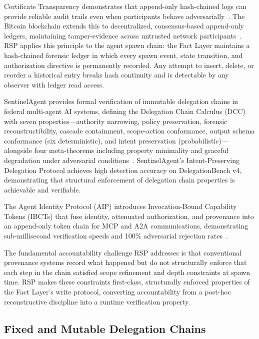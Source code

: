 Certificate Transparency demonstrates that append-only hash-chained logs can provide reliable audit trails even when participants behave adversarially~\cite{laurie2013certificate}. The Bitcoin blockchain extends this to decentralized, consensus-based append-only ledgers, maintaining tamper-evidence across untrusted network participants~\cite{nakamoto2008bitcoin}. RSP applies this principle to the agent spawn chain: the Fact Layer maintains a hash-chained forensic ledger in which every spawn event, state transition, and authorization directive is permanently recorded. Any attempt to insert, delete, or reorder a historical entry breaks hash continuity and is detectable by any observer with ledger read access.

SentinelAgent provides formal verification of immutable delegation chains in federal multi-agent AI systems, defining the Delegation Chain Calculus (DCC) with seven properties---authority narrowing, policy preservation, forensic reconstructibility, cascade containment, scope-action conformance, output schema conformance (six deterministic), and intent preservation (probabilistic)---alongside four meta-theorems including property minimality and graceful degradation under adversarial conditions~\cite{sentinelagent2026}. SentinelAgent's Intent-Preserving Delegation Protocol achieves high detection accuracy on DelegationBench v4, demonstrating that structural enforcement of delegation chain properties is achievable and verifiable.

The Agent Identity Protocol (AIP) introduces Invocation-Bound Capability Tokens (IBCTs) that fuse identity, attenuated authorization, and provenance into an append-only token chain for MCP and A2A communications, demonstrating sub-millisecond verification speeds and 100\% adversarial rejection rates~\cite{aip2025}.

The fundamental accountability challenge RSP addresses is that conventional provenance systems record what happened but do not structurally enforce that each step in the chain satisfied scope refinement and depth constraints at spawn time. RSP makes these constraints first-class, structurally enforced properties of the Fact Layer's write protocol, converting accountability from a post-hoc reconstructive discipline into a runtime verification property.

\subsection{Fixed and Mutable Delegation Chains}

